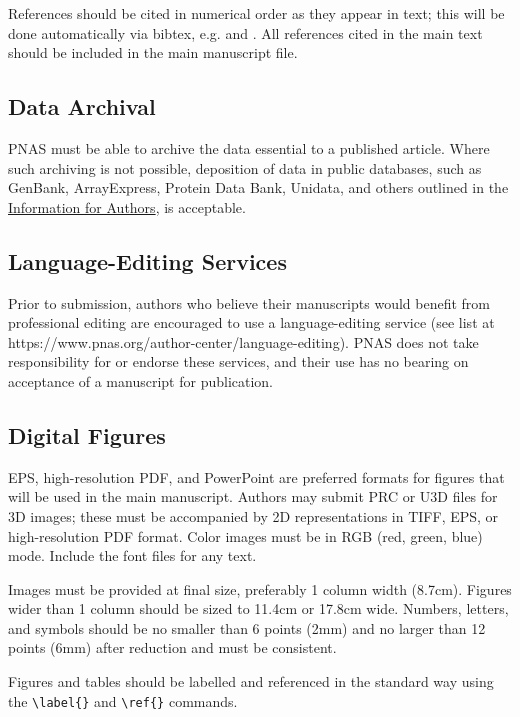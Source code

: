 \documentclass[9pt,twoside]{pnas-new}
\begin{document}
References should be cited in numerical order as they appear in text; this will be done automatically via bibtex, e.g. \cite{belkin2002using} and \cite{berard1994embedding,coifman2005geometric,phdthesis,masterthesis}. All references cited in the main text should be included in the main manuscript file.

\subsection*{Data Archival}

PNAS must be able to archive the data essential to a published article. Where such archiving is not possible, deposition of data in public databases, such as GenBank, ArrayExpress, Protein Data Bank, Unidata, and others outlined in the \href{https://www.pnas.org/author-center/editorial-and-journal-policies#materials-and-data-availability}{Information for Authors}, is acceptable.

\subsection*{Language-Editing Services}
Prior to submission, authors who believe their manuscripts would benefit from professional editing are encouraged to use a language-editing service (see list at https://www.pnas.org/author-center/language-editing). PNAS does not take responsibility for or endorse these services, and their use has no bearing on acceptance of a manuscript for publication.

\subsection*{Digital Figures}

EPS, high-resolution PDF, and PowerPoint are preferred formats for figures that will be used in the main manuscript. Authors may submit PRC or U3D files for 3D images; these must be accompanied by 2D representations in TIFF, EPS, or high-resolution PDF format. Color images must be in RGB (red, green, blue) mode. Include the font files for any text.

Images must be provided at final size, preferably 1 column width (8.7cm). Figures wider than 1 column should be sized to 11.4cm or 17.8cm wide. Numbers, letters, and symbols should be no smaller than 6 points (2mm) and no larger than 12 points (6mm) after reduction and must be consistent.

Figures and tables should be labelled and referenced in the standard way using the \verb|\label{}| and \verb|\ref{}| commands.
\end{document}
